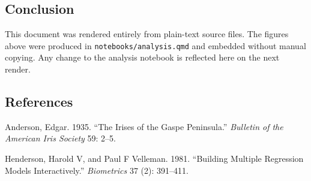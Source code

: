 \documentclass[
  letterpaper,
  DIV=11,
  numbers=noendperiod]{scrartcl}
\newlength{\cslhangindent}
\newenvironment{CSLReferences}[2] %
 {\begin{list}{}{%
  \setlength{\itemindent}{0pt}
  \setlength{\leftmargin}{0pt}
  \setlength{\parsep}{0pt}
  \ifodd #1
   \setlength{\leftmargin}{\cslhangindent}
   \setlength{\itemindent}{-1\cslhangindent}
  \fi
  \setlength{\itemsep}{#2\baselineskip}}}
 {\end{list}}
\begin{document}
\subsection{Conclusion}\label{conclusion}

This document was rendered entirely from plain-text source files. The
figures above were produced in \texttt{notebooks/analysis.qmd} and
embedded without manual copying. Any change to the analysis notebook is
reflected here on the next render.

\subsection*{References}\label{references}

\label{refs}
\begin{CSLReferences}{1}{0}
Anderson, Edgar. 1935. {``The Irises of the Gaspe Peninsula.''}
\emph{Bulletin of the American Iris Society} 59: 2--5.

Henderson, Harold V, and Paul F Velleman. 1981. {``Building Multiple
Regression Models Interactively.''} \emph{Biometrics} 37 (2): 391--411.

\end{CSLReferences}
\end{document}
